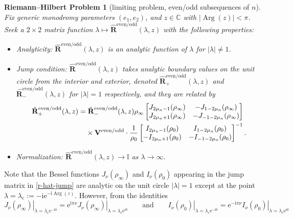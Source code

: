 \documentclass[pdftex]{sigma}
\numberwithin{equation}{section}
\newtheorem{rhp}[Theorem]{Riemann--Hilbert Problem}
\newcommand{\ee}{\mathrm{e}}
\newcommand{\ii}{\mathrm{i}}
\renewcommand{\arg}{\operatorname{Arg}}
\begin{document}
\begin{rhp}[limiting problem, even/odd subsequences of $n$]
Fix generic monodromy parameters $( e_1, e_2)$, and $z\in\mathbb{C}$ with $|{\arg}(z)|<\pi$. Seek a $2\times 2$ matrix function $\lambda\mapsto\hat{\mathbf{R}}^\mathrm{even/odd}(\lambda,z)$ with the following properties:
\begin{itemize}\itemsep=0pt
 \item Analyticity: $\hat{\mathbf{R}}^\mathrm{even/odd}(\lambda,z)$ is an analytic function of $\lambda$ for $|\lambda|\neq 1$.
 \item Jump condition:
 $\hat{\mathbf{R}}^\mathrm{even/odd}(\lambda,z)$ takes analytic boundary values on the unit circle from the interior and exterior, denoted $\hat{\mathbf{R}}^\mathrm{even/odd}_+(\lambda,z)$ and $\hat{\mathbf{R}}^\mathrm{even/odd}_-(\lambda,z)$ for $|\lambda|=1$ respectively, and they are related by
 \begin{align}
 &\hat{\mathbf{R}}^\mathrm{even/odd}_+(\lambda,z)=\hat{\mathbf{R}}^\mathrm{even/odd}_-(\lambda,z) {\rho_\infty}\begin{bmatrix}J_{2\mu_n - 1}(\rho_\infty) & -J_{1- 2\mu_n}(\rho_\infty)\\
 J_{2\mu_n +1}(\rho_\infty) & -J_{-1-2\mu_n}(\rho_\infty)\end{bmatrix}\nonumber\\
 & \hphantom{\hat{\mathbf{R}}^\mathrm{even/odd}_+(\lambda,z)=}{}
 \times\mathbf{V}^\mathrm{even/odd}
 \cdot \dfrac{1}{\rho_0}\begin{bmatrix}I_{2\mu_n - 1}(\rho_0) & I_{1- 2\mu_n}(\rho_0)\\
 -I_{2\mu_n +1}(\rho_0) & -I_{-1-2\mu_n}(\rho_0)\end{bmatrix}^{-1}.\label{r-hat-jump}
 \end{align}
 \item Normalization:
 $\hat{\mathbf{R}}^\mathrm{even/odd}(\lambda,z)\to\mathbb{I}$ as $\lambda\to\infty$.
\end{itemize}
\label{rhp:Rhat-even/odd}
\end{rhp}
Note that the Bessel functions $J_\nu(\rho_\infty)$ and $I_\nu(\rho_0)$ appearing in the jump matrix in \eqref{r-hat-jump} are analytic on the unit circle $|\lambda|=1$ except at the point $\lambda=\lambda_\mathrm{c}:=-\ii\ee^{-\ii\arg(z)}$. However, from the identities
\[
\left.J_\nu(\rho_\infty)\right|_{\lambda=\lambda_\mathrm{c}\ee^{-\ii 0}}=\ee^{\ii\pi\nu}\left.J_\nu(\rho_\infty)\right|_{\lambda=\lambda_\mathrm{c}\ee^{\ii 0}} \qquad \text{and} \qquad
\left.I_\nu(\rho_0)\right|_{\lambda=\lambda_\mathrm{c}\ee^{-\ii 0}}=\ee^{-\ii\pi\nu}\left.I_\nu(\rho_0)\right|_{\lambda=\lambda_\mathrm{c}\ee^{\ii 0}}
\]
\end{document}
